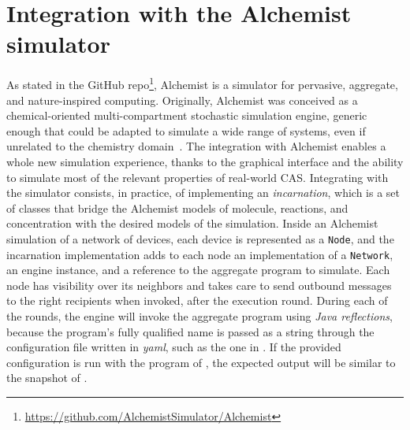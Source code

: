 \section{Integration with the Alchemist simulator}

As stated in the GitHub repo\footnote{\url{https://github.com/AlchemistSimulator/Alchemist}}, Alchemist is a simulator for pervasive, aggregate, and nature-inspired computing.
%
Originally, Alchemist was conceived as a chemical-oriented multi-compartment stochastic simulation engine, generic enough that could be adapted to simulate a wide range of systems, even if unrelated to the chemistry domain~\cite{alchemist}.
%
The integration with Alchemist enables a whole new simulation experience, thanks to the graphical interface and the ability to simulate most of the relevant properties of real-world \ac{CAS}.
%
Integrating with the simulator consists, in practice, of implementing an \textit{incarnation}, which is a set of classes that bridge the Alchemist models of molecule, reactions, and concentration with the desired models of the simulation.
%
Inside an Alchemist simulation of a network of devices, each device is represented as a \texttt{Node}, and the incarnation implementation adds to each node an implementation of a \texttt{Network}, an engine instance, and a reference to the aggregate program to simulate.
%
Each node has visibility over its neighbors and takes care to send outbound messages to the right recipients when invoked, after the execution round.
%
During each of the rounds, the engine will invoke the aggregate program using \textit{Java reflections}, because the program's fully qualified name is passed as a string through the configuration file written in \textit{yaml}, such as the one in .
%
If the provided configuration is run with the program of , the expected output will be similar to the snapshot of .





